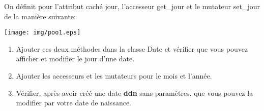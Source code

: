 \documentclass[11pt,a4paper]{article}
\begin{document}
\begin{enumerate}
On définit pour l'attribut caché jour, l'accesseur get\_jour et le mutateur set\_jour de la manière suivante:
\begin{center}
\texttt{[image: img/poo1.eps]}
\end{center}
\begin{enumerate}
\item Ajouter ces deux méthodes dans la classe Date et vérifier que vous pouvez afficher et modifier le jour d'une date.
\item Ajouter les accesseurs et les mutateurs pour le mois et l'année.
\item Vérifier, après avoir créé une date \textbf{ddn} sans paramètres, que vous pouvez la modifier par votre date de naissance.
\end{enumerate}
\end{enumerate}
\end{document}
